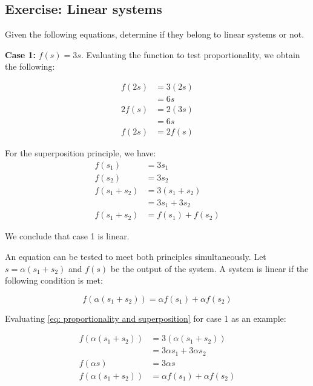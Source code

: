 \subsection{Exercise: Linear systems}
Given the following equations, determine if they belong to 
linear systems or not.

\textbf{Case 1:} $f(s) = 3s$. Evaluating the function to 
test proportionality, we obtain the following:

\begin{equation*}
 \begin{split}
  f(2s) & =3(2s)\\
  & = 6 s\\
  2 f(s) &= 2 (3s)\\
  &= 6s\\
  f(2s)&=2f(s)
 \end{split}
\end{equation*}

For the superposition principle, we have:
\begin{equation*}
 \begin{split}
  f(s_1) & =3s_1\\
  f(s_2) & =3s_2\\
  f(s_1+s_2) & =3(s_1+s_2)\\
   &= 3s_1 + 3s_2\\
  f(s_1 + s_2) & = f(s_1) + f(s_2)
 \end{split}
\end{equation*}

We conclude that case 1 is linear.


An equation can be tested to meet both principles 
simultaneously. Let $s=\alpha(s_1+s_2)$ and $f(s)$ be the 
output of the system. A system is linear if the following 
condition is met:

\begin{equation}
  f(\alpha(s_1+s_2))  = \alpha f(s_1) + \alpha f(s_2)
  \label{eq: proportionality and superposition}
\end{equation}

Evaluating \ref{eq: proportionality and superposition} for 
case 1 as an example:

\begin{equation*}
\begin{split}
 f(\alpha (s_1 + s_2)) & = 3 (\alpha (s_1 + s_2))\\
 & = 3 \alpha s_1 + 3 \alpha s_2\\
 f(\alpha s) & = 3 \alpha s \\
 f(\alpha (s_1 + s_2)) & = \alpha f(s_1) + \alpha f(s_2)
\end{split}
\end{equation*}


